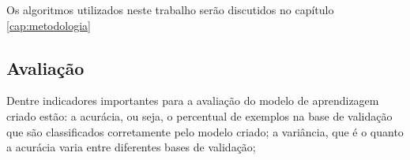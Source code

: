 Os algoritmos utilizados neste trabalho serão discutidos no capítulo \ref{cap:metodologia}






\subsection{Avaliação}\label{sec:avaliacao}

Dentre indicadores importantes para a avaliação do modelo de aprendizagem criado estão: a acurácia, ou seja, o percentual de exemplos na base de validação que são classificados corretamente pelo modelo criado; a variância, que é o quanto a acurácia varia entre diferentes bases de validação;

